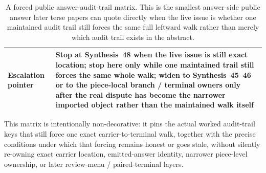 \documentclass[11pt]{article}
\begin{document}
\begin{table}[t]
\begin{tabularx}{\linewidth}{@{}lX@{}}
Escalation pointer & Stop at Synthesis~48 when the live issue is still exact location; stop here only while one maintained trail still forces the same whole walk; widen to Synthesis~45--46 or to the piece-local branch / terminal owners only after the real dispute has become the narrower imported object rather than the maintained walk itself \\
\bottomrule
\end{tabularx}
\caption{A forced public answer-audit-trail matrix. This is the smallest answer-side public answer later terse papers can quote directly when the live issue is whether one maintained audit trail still forces the same full leftward walk rather than merely which audit trail exists in the abstract.}
\label{tab:forced-public-answer-audit-trail-matrix}
\end{table}

This matrix is intentionally non-decorative: it pins the actual worked audit-trail keys that still force one exact carrier-to-terminal walk, together with the precise conditions under which that forcing remains honest or goes stale, without silently re-owning exact carrier location, emitted-answer identity, narrower piece-level ownership, or later review-menu / paired-terminal layers.\cite{series:workedexample}
\end{document}

